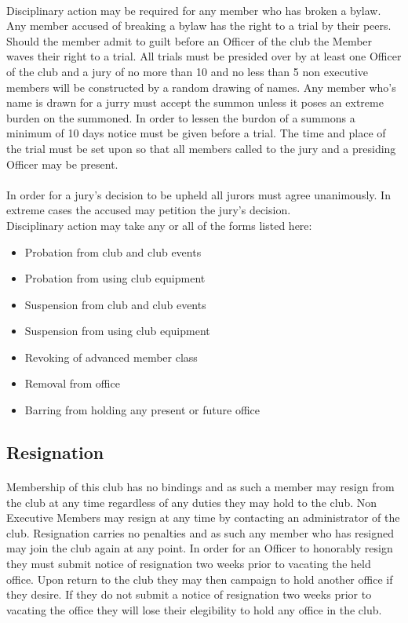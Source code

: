 \documentclass[12pt]{article}
\begin{document}
\paragraph{}
Disciplinary action may be required for any member who has broken a bylaw. Any member accused of breaking a bylaw has the right to a trial by their peers. Should the member admit to guilt before an Officer of the club the Member waves their right to a trial. All trials must be presided over by at least one Officer of the club and a jury of no more than 10 and no less than 5 non executive members will be constructed by a random drawing of names. Any member who's name is drawn for a jurry must accept the summon unless it poses an extreme burden on the summoned. In order to lessen the burdon of a summons a minimum of 10 days notice must be given before a trial. The time and place of the trial must be set upon so that all members called to the jury and a presiding Officer may be present. 

\paragraph{}
In order for a jury's decision to be upheld all jurors must agree unanimously. In extreme cases the accused may petition the jury's decision.  
\\
Disciplinary action may take any or all of the forms listed here:
\begin{itemize}
\item Probation from club and club events
\item Probation from using club equipment
\item Suspension from club and club events
\item Suspension from using club equipment
\item Revoking of advanced member class
\item Removal from office
\item Barring from holding any present or future office

\end{itemize}

\subsection{Resignation}
\paragraph{}
Membership of this club has no bindings and as such a member may resign from the club at any time regardless of any duties they may hold to the club. Non Executive Members may resign at any time by contacting an administrator of the club. Resignation carries no penalties and as such any member who has resigned may join the club again at any point. In order for an Officer to honorably resign they must submit notice of resignation two weeks prior to vacating the held office. Upon return to the club they may then campaign to hold another office if they desire. If they do not submit a notice of resignation two weeks prior to vacating the office they will lose their elegibility to hold any office in the club. 
\end{document}
